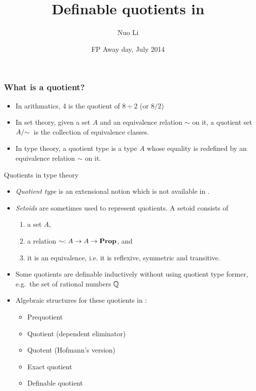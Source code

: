 \documentclass[11pt, mathserif,handout]{beamer}
\author{
Nuo Li
}
\institute{
School of Computer Science \\  University of Nottingham, UK
}
\date[04/07/14]{FP Away day, July 2014}
\title{Definable quotients in \itt}
\subtitle[FP Away day 2014]{}
\begin{document}
\frame{\titlepage}




\begin{frame}
\frametitle{What is a quotient?}

\begin{itemize}
\item In arithmatics, 4 is the quotient of $8 \div 2$ (or $8/2$)
\pause
\item In set theory, given a set $A$ and an equivalence relation
  $\sim$ on it, a quotient set $\qset{A}$ is the collection of equivalence
  classes.

\pause
\item In type theory, a quotient type is a type $A$ whose equality
  is redefined by an equivalence relation $\sim$ on it.
\end{itemize}


\end{frame}


\begin{frame}{Quotients in type theory}

\begin{itemize}
\item \emph{Quotient type} is an extensional notion which is not available
  in \itt.

\pause

\item \emph{Setoids} are sometimes used to represent quotients.
A setoid consists of
\begin{enumerate}
\item a set $A$,
\item a relation $\sim : A \rightarrow A \rightarrow \operatorname{\mathbf{Prop}}$, and
\item it is an equivalence, i.e. it is reflexive, symmetric and transitive.
\end{enumerate}

\pause

\item Some quotients are definable inductively without using quotient type former,
  e.g.\ the set of rational numbers $\mathbb{Q}$

\pause

\item Algebraic structures for these quotients in \itt:

\begin{itemize}
\item Prequotient
\item Quotient (dependent eliminator)
\item Quotent (Hofmann's version)
\item Exact quotient
\item Definable quotient 
\end{itemize}

\end{itemize}


\end{frame}
\end{document}
